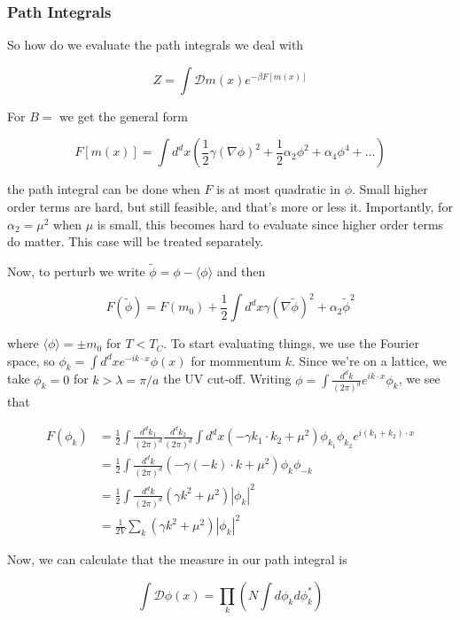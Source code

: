 \documentclass{article}
\theoremstyle{definition}
\begin{document}
\subsubsection{Path Integrals}

So how do we evaluate the path integrals we deal with

$$ Z = \int \mathcal{D}m(x) e^{-\beta F[m(x)]} $$

For $B = $ we get the general form

$$ F[m(x)] = \int d^dx (\frac{1}{2} \gamma (\nabla \phi)^2 + \frac{1}{2} \alpha_2
\phi^2 + \alpha_4 \phi^4 + \dots) $$

the path integral can be done when $F$ is at most quadratic in $\phi$. Small
higher order terms are hard, but still feasible, and that's more or less it.
Importantly, for $\alpha_2 = \mu^2$ when $\mu$ is small, this becomes hard to
evaluate since higher order terms do matter. This case will be treated
separately.

Now, to perturb we write $\tilde{\phi} = \phi - \langle \phi \rangle$ and then

$$ F(\tilde{\phi}) = F(m_0) + \frac{1}{2} \int d^dx \gamma (\nabla
\tilde{\phi})^2 + \alpha_2 \tilde{\phi}^2$$

where $\langle  \phi \rangle = \pm m_0$ for $T < T_C$. To start evaluating
things, we use the Fourier space, so $\phi_k = \int d^d x e^{-i k \cdot x}
\phi(x)$ for mommentum $k$. Since we're on a lattice, we take $\phi_k = 0$ for
$k > \lambda = \pi / a$ the UV cut-off. Writing $\phi = \int
\frac{d^dk}{(2\pi)^d} e^{ik \cdot x} \phi_k$, we see that

\begin{align*}
  F(\phi_k) &= \frac{1}{2} \int \frac{d^d k_1}{(2\pi)^d} \frac{d^d k_2}{(2\pi)^d} \int d^d x (-\gamma k_1 \cdot k_2 + \mu^2) \phi_{k_1} \phi_{k_2} e^{i(k_1 + k_2) \cdot x} \\
            &= \frac{1}{2} \int \frac{d^d k}{(2\pi)^d} (-\gamma (-k) \cdot k + \mu^2) \phi_k \phi_{-k} \\
            &= \frac{1}{2} \int \frac{d^d k}{(2\pi)^d} (\gamma k^2 + \mu^2) |\phi_k|^2 \\
            &= \frac{1}{2V} \sum_k (\gamma k^2 + \mu^2) |\phi_k|^2
\end{align*}

Now, we can calculate that the measure in our path integral is

$$ \int \mathcal{D}\phi(x) = \prod_k \left( N \int d\phi_k d\phi_k^* \right) $$
\end{document}
